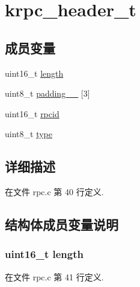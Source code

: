 \hypertarget{structkrpc__header__t}{}\section{krpc\+\_\+header\+\_\+t}
\label{structkrpc__header__t}
\subsection*{成员变量}
\begin{DoxyCompactItemize}
\item 
uint16\+\_\+t \hyperlink{structkrpc__header__t_a1892eba2086d12ac2b09005aeb09ea3b}{length}
\item 
uint8\+\_\+t \hyperlink{structkrpc__header__t_a40bcd7707eaaaa86e933724ca2371510}{padding\+\_\+\+\_\+} \mbox{[}3\mbox{]}
\item 
uint16\+\_\+t \hyperlink{structkrpc__header__t_aff565cee9af9d43e0a128d368f15ef70}{rpcid}
\item 
uint8\+\_\+t \hyperlink{structkrpc__header__t_a1d127017fb298b889f4ba24752d08b8e}{type}
\end{DoxyCompactItemize}


\subsection{详细描述}


在文件 rpc.\+c 第 40 行定义.



\subsection{结构体成员变量说明}
\hypertarget{structkrpc__header__t_a1892eba2086d12ac2b09005aeb09ea3b}{}
\subsubsection[{length}]{\setlength{\rightskip}{0pt plus 5cm}uint16\+\_\+t length}\label{structkrpc__header__t_a1892eba2086d12ac2b09005aeb09ea3b}


在文件 rpc.\+c 第 41 行定义.

\hypertarget{structkrpc__header__t_a40bcd7707eaaaa86e933724ca2371510}{}

